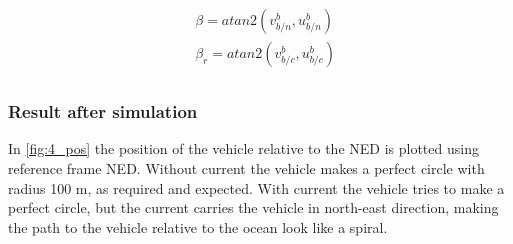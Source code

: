 \begin{equation}
\begin{aligned}
	& \beta = atan2(v^b_{b/n}, u^b_{b/n} ) \\
	& \beta_r = atan2(v^b_{b/c}, u^b_{b/c} )  \\
	\label{eq:crab_slip_approx}
\end{aligned}
\end{equation}

\subsubsection*{Result after simulation}

In \ref{fig:4_pos} the position of the vehicle relative to the NED is plotted using reference frame NED. Without current the vehicle makes a perfect circle with radius 100 m, as required and expected. With current the vehicle tries to make a perfect circle, but the current carries the vehicle in north-east direction, making the path to the vehicle relative to the ocean look like a spiral.

